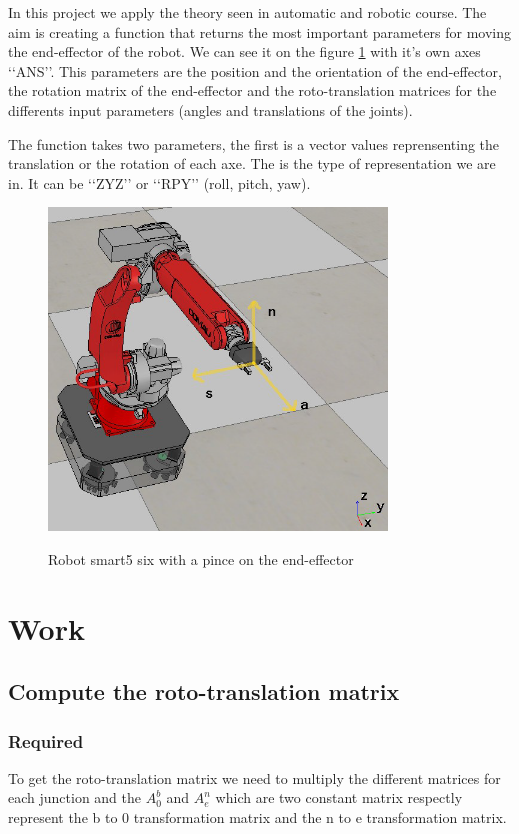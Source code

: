 \documentclass[english,a4paper,11pt]{report}
\begin{document}
	In this project we apply the theory seen in automatic and robotic course.
	The aim is creating a function that returns the most important parameters for moving the end-effector of the robot. We can see it on the figure \ref{endEf} with it\rq{}s own axes \lq\lq{}ANS\rq\rq{}. This parameters are the position and the orientation of the end-effector, the rotation matrix of the end-effector and the roto-translation matrices for the differents input parameters (angles and translations of the joints).
	
	The function takes two parameters, the first is a vector values reprensenting the translation or the rotation of each axe. The is the type of representation we are in. It can be \lq\lq{}ZYZ\rq\rq{} or \lq\lq{}RPY\rq\rq{} (roll, pitch, yaw).
	\begin{figure}[h]
	\center
		\includegraphics[width=9cm]{images_not_compressed/endEffector.png}
		\label{endEf}
		\caption{Robot smart5 six with a pince on the end-effector}
	\end{figure}

	\chapter{Work}
	\section{Compute the roto-translation matrix}
	\subsection{Required}
	To get the roto-translation matrix we need to multiply the different matrices for each junction and the $A^{b}_{0}$ and $A^{n}_{e}$ which are two constant matrix respectly represent the b to 0 transformation matrix and the n to e transformation matrix.
	
\end{document}
